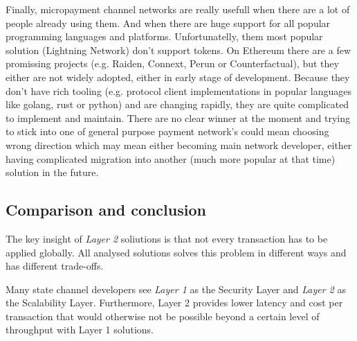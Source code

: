 \documentclass[a4paper,12pt]{article}
\begin{document}
Finally, micropayment channel networks are really usefull when there are a lot
of people already using them. And when there are huge support for all popular 
programming languages and platforms. Unfortunatelly, them most popular solution
(Lightning Network) don't support tokens. On Ethereum there are a few promissing
projects (e.g. Raiden, Connext, Perun or Counterfactual), but they either are 
not widely adopted, either in early stage of development. Because they don't 
have rich tooling (e.g. protocol client implementations in popular languages 
like golang, rust or python) and are changing rapidly, they are quite 
complicated to implement and maintain. There are no clear winner at the moment
and trying to stick into one of general purpose payment network's could mean
choosing wrong direction which may mean either becoming main network developer,
either having complicated migration into another (much more popular at that 
time) solution in the future.

\subsection{Comparison and conclusion}

The key insight of \textit{Layer 2} soliutions is that not every transaction has
to be applied globally. All analysed solutions solves this problem in different 
ways and has different trade-offs. 

Many state channel developers see \textit{Layer 1} as the Security Layer and 
\textit{Layer 2} as the Scalability Layer. Furthermore, Layer 2 provides lower 
latency and cost per transaction that would otherwise not be possible beyond a 
certain level of throughput with Layer 1 solutions.
\end{document}
